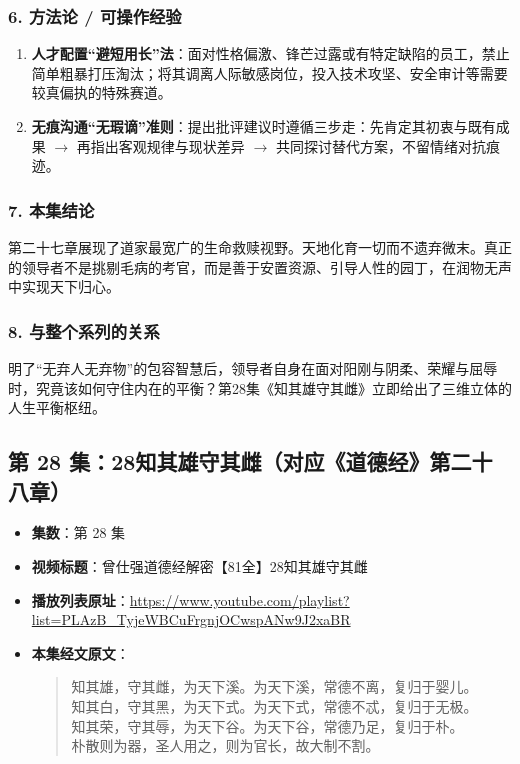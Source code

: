 \subsubsection{6. 方法论 / 可操作经验}
\begin{enumerate}
    \item \textbf{人才配置“避短用长”法}：面对性格偏激、锋芒过露或有特定缺陷的员工，禁止简单粗暴打压淘汰；将其调离人际敏感岗位，投入技术攻坚、安全审计等需要较真偏执的特殊赛道。
    \item \textbf{无痕沟通“无瑕谪”准则}：提出批评建议时遵循三步走：先肯定其初衷与既有成果 $\rightarrow$ 再指出客观规律与现状差异 $\rightarrow$ 共同探讨替代方案，不留情绪对抗痕迹。
\end{enumerate}

\subsubsection{7. 本集结论}
第二十七章展现了道家最宽广的生命救赎视野。天地化育一切而不遗弃微末。真正的领导者不是挑剔毛病的考官，而是善于安置资源、引导人性的园丁，在润物无声中实现天下归心。

\subsubsection{8. 与整个系列的关系}
明了“无弃人无弃物”的包容智慧后，领导者自身在面对阳刚与阴柔、荣耀与屈辱时，究竟该如何守住内在的平衡？第28集《知其雄守其雌》立即给出了三维立体的人生平衡枢纽。

\clearpage

\subsection{第 28 集：28知其雄守其雌（对应《道德经》第二十八章）}
\label{sec:ep28}

\begin{itemize}
    \item \textbf{集数}：第 28 集
    \item \textbf{视频标题}：曾仕强道德经解密【81全】28知其雄守其雌
    \item \textbf{播放列表原址}：\url{https://www.youtube.com/playlist?list=PLAzB_TyjeWBCuFrgnjOCwspANw9J2xaBR}
    \item \textbf{本集经文原文}：
    \begin{quote}\kaishu
    知其雄，守其雌，为天下溪。为天下溪，常德不离，复归于婴儿。\\
    知其白，守其黑，为天下式。为天下式，常德不忒，复归于无极。\\
    知其荣，守其辱，为天下谷。为天下谷，常德乃足，复归于朴。\\
    朴散则为器，圣人用之，则为官长，故大制不割。
    \end{quote}
\end{itemize}

